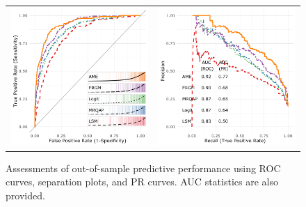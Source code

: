 \documentclass[12pt,pdflatex]{elsarticle}
\begin{document}
\begin{figure}[ht]
	\centering
	\caption{Assessments of out-of-sample predictive performance using ROC curves, separation plots, and PR curves. AUC statistics are also provided.}
	\begin{tabular}{cc}
	\includegraphics[width=.5\textwidth]{roc_outSample} & 
	\includegraphics[width=.5\textwidth]{rocPr_outSample}	
	\end{tabular}
	\label{fig:roc}
\end{figure}
\end{document}
